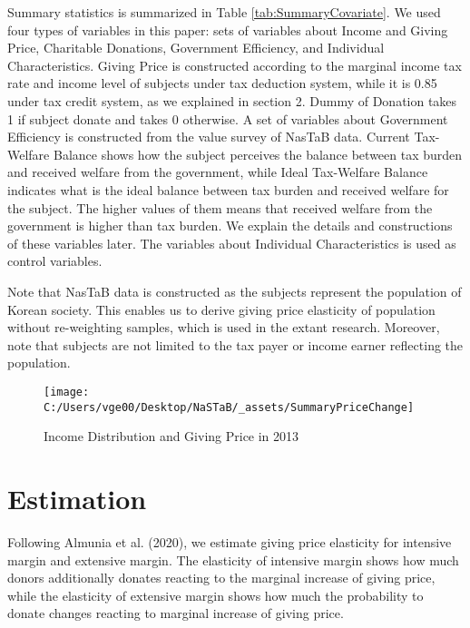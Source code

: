 \documentclass[ review  , 3p ]{elsarticle}
\begin{document}
  Summary statistics is summarized in Table \ref{tab:SummaryCovariate}. We used four types of variables in this paper: sets of variables about Income and Giving Price, Charitable Donations, Government Efficiency, and Individual Characteristics. Giving Price is constructed according to the marginal income tax rate and income level of subjects under tax deduction system, while it is 0.85 under tax credit system, as we explained in section 2. Dummy of Donation takes 1 if subject donate and takes 0 otherwise. A set of variables about Government Efficiency is constructed from the value survey of NasTaB data. Current Tax-Welfare Balance shows how the subject perceives the balance between tax burden and received welfare from the government, while Ideal Tax-Welfare Balance indicates what is the ideal balance between tax burden and received welfare for the subject. The higher values of them means that received welfare from the government is higher than tax burden. We explain the details and constructions of these variables later. The variables about Individual Characteristics is used as control variables.
  
  Note that NasTaB data is constructed as the subjects represent the population of Korean society. This enables us to derive giving price elasticity of population without re-weighting samples, which is used in the extant research. Moreover, note that subjects are not limited to the tax payer or income earner reflecting the population.
  
  \begin{figure}
  
  {\centering \texttt{[image: C:/Users/vge00/Desktop/NaSTaB/\_assets/SummaryPriceChange]} 
  
  }
  
  \caption{Income Distribution and Giving Price in 2013}\label{fig:showSummaryPriceChange}
  \end{figure}
  
  \hypertarget{estimation}{%
  \section{Estimation}\label{estimation}}
  
  Following Almunia et al. (2020), we estimate giving price elasticity for intensive margin and extensive margin. The elasticity of intensive margin shows how much donors additionally donates reacting to the marginal increase of giving price, while the elasticity of extensive margin shows how much the probability to donate changes reacting to marginal increase of giving price.
  
\end{document}
